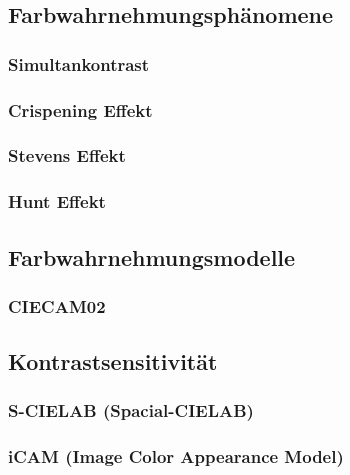 \documentclass[a4paper, 11pt, accentcolor = tud3b]{tudreport}
\begin{document}
			\subsection{Farbwahrnehmungsphänomene} %

				\subsubsection{Simultankontrast} %

				\subsubsection{Crispening Effekt} %

				\subsubsection{Stevens Effekt} %

				\subsubsection{Hunt Effekt} %

			\subsection{Farbwahrnehmungsmodelle} %

				\subsubsection{CIECAM02} %

			\subsection{Kontrastsensitivität} %

				\subsubsection{S-CIELAB (Spacial-CIELAB)} %

				\subsubsection{iCAM (Image Color Appearance Model)} %
\end{document}
